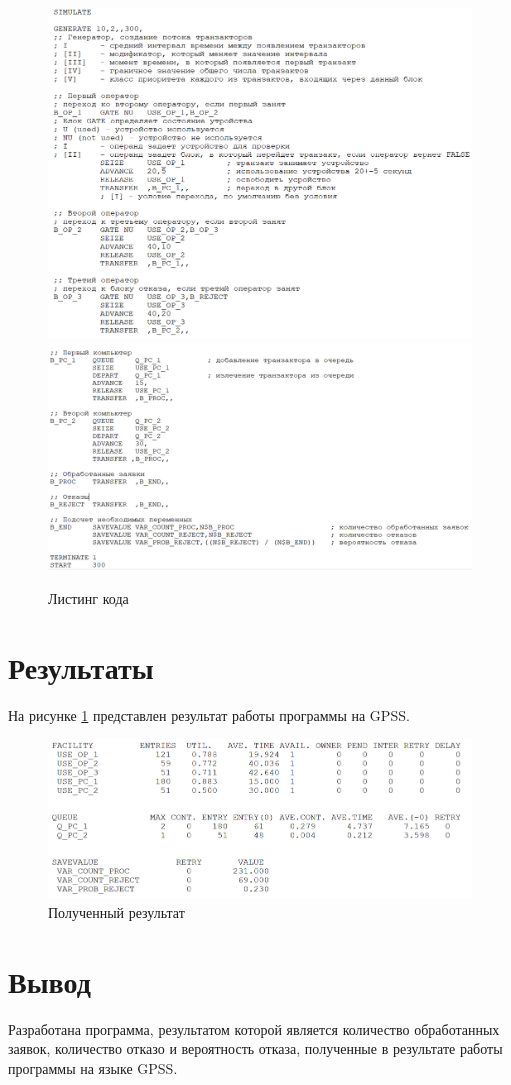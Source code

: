 \begin{figure}[H]
    \centering
    \includegraphics[width=1\textwidth]{img/content/code_1.png}
    \includegraphics[width=1\textwidth]{img/content/code_2.png}
    \caption{Листинг кода}
\end{figure}

\section{Результаты}

На рисунке \ref{fig:result} представлен результат работы программы на GPSS.

\begin{figure}[H]
    \centering
    \includegraphics[width=1\textwidth]{img/content/result.png}
    \caption{Полученный результат}
    \label{fig:result}
\end{figure}

\section{Вывод}

Разработана программа, результатом которой является количество обработанных заявок, количество отказо и вероятность отказа, полученные в результате работы программы на языке GPSS.
